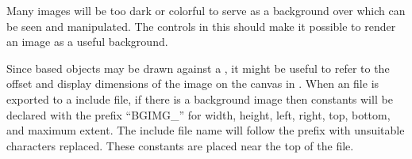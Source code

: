 		Many images will be too dark or colorful to serve
		as a background over which  can be
		seen and manipulated. The controls in this 
		should make it possible to render an image as a
		useful background.

		Since  based objects may be drawn against a
		, it might be useful to refer to the
		offset and display dimensions of the image on the canvas
		in \IXpov{} . When an \IXpkg{} file is exported to
		a \IXpov{} include file, if there is a background image
		then constants will be declared with the prefix
		``BGIMG\_'' for width, height, left, right,
		top, bottom, and maximum extent. The include file
		name will follow the prefix with unsuitable characters
		replaced. These constants are placed near the top
		of the file.
